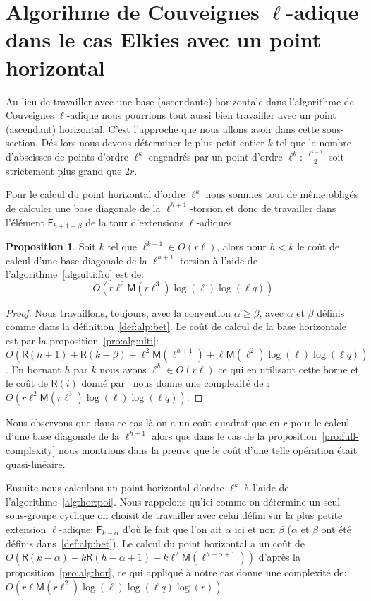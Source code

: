 \documentclass[10pt,a4paper]{book}
\theoremstyle{plain}
\theoremstyle{definition}
\theoremstyle{definition}
\theoremstyle{definition}
\theoremstyle{definition}
\newtheorem{prop}[thm]{Proposition}
\theoremstyle{definition}
\theoremstyle{remark}
\theoremstyle{remark}
\theoremstyle{definition}
\begin{document}
\section{Algorihme de Couveignes $\ell$-adique dans le cas Elkies avec un point horizontal}
\label{sec:var:cou:uni}


Au lieu de travailler avec une base (ascendante) horizontale dans l'algorithme 
de Couveignes $\ell$-adique nous pourrions tout aussi bien travailler avec un 
point (ascendant) horizontal. C'est l'approche que nous allons avoir dans 
cette sous-section.
Dés lors nous devons déterminer le plus petit entier $k$ tel que le nombre 
d'abscisses de points d'ordre $\ell^k$ engendrés par un point d'ordre $\ell^k$:
$\frac{\ell^{k-1}}{2}$ soit strictement plus grand que $2r$.

Pour le calcul du point horizontal d'ordre $\ell^k$ nous sommes tout de même 
obligés de calculer une base diagonale de la $\ell^{h+1}$-torsion et donc de 
travailler dans l'élément $\mathsf{F}_{h+1-\beta}$ de la tour d'extensions 
$\ell$-adiques.

\begin{prop}
Soit $k$ tel que $\ell^{k-1} \in O(r\ell)$, alors pour $h<k$ le coût de calcul d'une 
base diagonale de la $\ell^{h+1}$ torsion à l'aide de 
l'algorithme~\ref{alg:ulti:fro} est de:
\[
O(r \ell^{2} \mathsf{M}(r\ell^{3})\log(\ell)\log(\ell q) )
\]
\end{prop}

\begin{proof}
Nous travaillons, toujours, avec la convention $\alpha \geqslant \beta$, 
avec $\alpha$ et $\beta$ définis comme dans la définition~\ref{def:alp:bet}.
Le coût de calcul de la base horizontale est par la proposition~\ref{pro:alg:ulti}:
$O(\mathsf{R}(h+1)+ \mathsf{R}(k-\beta)+\ell^2 \mathsf{M}(\ell^{h+1})+\ell \mathsf{M}(\ell^2)\log(\ell)\log(\ell q))$. 
En bornant $h$ par $k$ nous avons $\ell^h \in O(r\ell)$ ce qui en utilisant 
cette borne et le coût de $\mathsf{R}(i)$ donné 
par~\cite[chapter 14.5]{vzGJG03} nous donne une complexité de :
$O(r \ell^{2} \mathsf{M}(r\ell^{3})\log(\ell)\log(\ell q) )$.
\end{proof}
Nous observons que dans ce cas-là on a un coût quadratique en $r$ pour le 
calcul d'une base diagonale de la $\ell^{h+1}$ alors que dans le cas de la 
proposition~\ref{pro:full-complexity} nous montrions dans la preuve que le coût 
d'une telle opération était quasi-linéaire.

Ensuite nous calculons un point horizontal d'ordre $\ell^k$ à l'aide de 
l'algorithme~\ref{alg:hor:poi}. Nous rappelons qu'ici comme on détermine un seul 
sous-groupe cyclique on choisit de travailler avec celui défini 
sur la plus petite extension $\ell$-adique: $\mathsf{F}_{k-\alpha}$ d'où le 
fait que l'on ait $\alpha$ ici et non $\beta$ ($\alpha$ et $\beta$ 
ont été définis dans~\ref{def:alp:bet}). Le calcul du point horizontal a un 
coût de 
$O(\mathsf{R}(k-\alpha) + k\mathsf{R}(h-\alpha+1) + k\ell^2\mathsf{M}(\ell^{h-\alpha+1}))$
d'après la proposition~\ref{pro:alg:hor}, ce qui appliqué à notre cas donne 
une complexité de: $O(r \ell \mathsf{M}(r \ell^{2})\log(\ell)\log(\ell q) \log(r))$.
\end{document}
